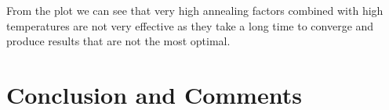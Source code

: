 \documentclass[10pt, titlepage, a4paper]{article}
\begin{document}
From the plot we can see that very high annealing factors combined with high temperatures are not very effective as they take a long time to
converge and produce results that are not the most optimal.


\section{Conclusion and Comments}




\end{document}
